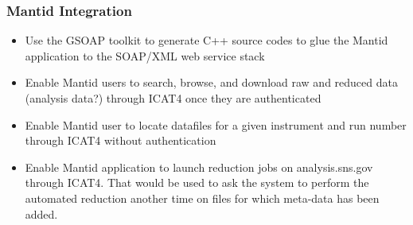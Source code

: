 \subsubsection{Mantid Integration}
\begin{itemize}
\item Use the GSOAP toolkit to generate C++ source codes to glue the Mantid application to the SOAP/XML web service stack
\item Enable Mantid users to search, browse, and download raw and reduced data (analysis data?) through ICAT4 once they are authenticated
\item Enable Mantid user to locate datafiles for a given instrument and run number through ICAT4 without authentication
\item Enable Mantid application to launch reduction jobs on analysis.sns.gov through ICAT4. That would be used to ask the system to perform the automated reduction another time on files for which meta-data has been added.
\end{itemize}

